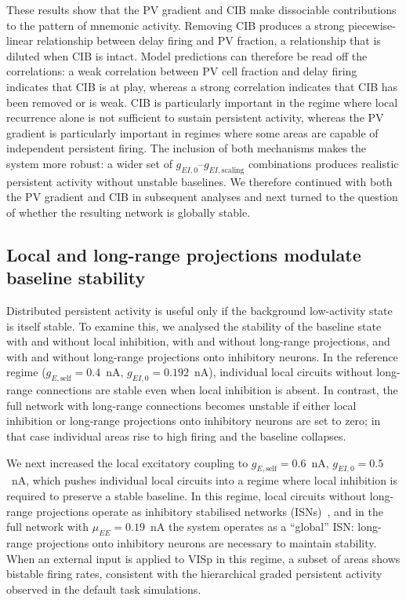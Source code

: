 \documentclass[11pt]{article}
\begin{document}
These results show that the PV gradient and CIB make dissociable contributions to the pattern of mnemonic activity. Removing CIB produces a strong piecewise-linear relationship between delay firing and PV fraction, a relationship that is diluted when CIB is intact. Model predictions can therefore be read off the correlations: a weak correlation between PV cell fraction and delay firing indicates that CIB is at play, whereas a strong correlation indicates that CIB has been removed or is weak. CIB is particularly important in the regime where local recurrence alone is not sufficient to sustain persistent activity, whereas the PV gradient is particularly important in regimes where some areas are capable of independent persistent firing. The inclusion of both mechanisms makes the system more robust: a wider set of $g_{EI,0}$--$g_{EI,\text{scaling}}$ combinations produces realistic persistent activity without unstable baselines. We therefore continued with both the PV gradient and CIB in subsequent analyses and next turned to the question of whether the resulting network is globally stable.

\subsection{Local and long-range projections modulate baseline stability}

Distributed persistent activity is useful only if the background low-activity state is itself stable. To examine this, we analysed the stability of the baseline state with and without local inhibition, with and without long-range projections, and with and without long-range projections onto inhibitory neurons. In the reference regime ($g_{E,\text{self}}=0.4$~nA, $g_{EI,0}=0.192$~nA), individual local circuits without long-range connections are stable even when local inhibition is absent. In contrast, the full network with long-range connections becomes unstable if either local inhibition or long-range projections onto inhibitory neurons are set to zero; in that case individual areas rise to high firing and the baseline collapses.

We next increased the local excitatory coupling to $g_{E,\text{self}}=0.6$~nA, $g_{EI,0}=0.5$~nA, which pushes individual local circuits into a regime where local inhibition is required to preserve a stable baseline. In this regime, local circuits without long-range projections operate as inhibitory stabilised networks (ISNs)~\cite{tsodyks1997paradoxical,sanzeni2020inhibition}, and in the full network with $\mu_{EE}=0.19$~nA the system operates as a ``global'' ISN: long-range projections onto inhibitory neurons are necessary to maintain stability. When an external input is applied to VISp in this regime, a subset of areas shows bistable firing rates, consistent with the hierarchical graded persistent activity observed in the default task simulations.
\end{document}

